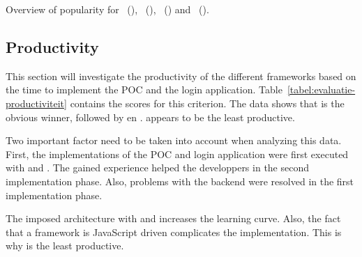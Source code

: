 \documentclass[a4paper]{artikel3}
\begin{document}
\begin{table}
\centering
\resizebox{8.5cm}{!} {
}
\caption{Overview of popularity for \st{}~(\sta), \kendo{}~(\kendoa), \jqm{}~(\jqma) and \lungo{}~(\lungoa).}
\label{tabel:evaluatie-popularity}
\end{table}


\subsection{Productivity} %
\label{sec:evaluation-productivity}


This section will investigate the productivity of the different frameworks based on the time to implement the POC and the login application.
Table~\ref{tabel:evaluatie-productiviteit} contains the scores for this criterion.
The data shows that \lungo{} is the obvious winner,  followed by \kendo{} en \jqm{}.
\st{} appears to be the least productive.

Two important factor need to be taken into account when analyzing this data.
First,  the implementations of the POC and login application were first executed with \jqm{} and \st{}.
The gained experience helped the developpers in the second implementation phase.
Also,  problems with the backend were resolved in the first implementation phase.

The imposed architecture with \st{} and \kendo{} increases the learning curve.
Also, the fact that a framework is JavaScript driven complicates the implementation.
This is why \st{} is the least productive.
\end{document}
